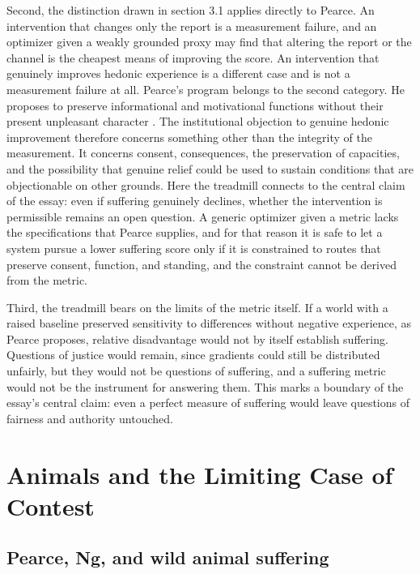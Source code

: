 \documentclass[11pt]{article}
\begin{document}
Second, the distinction drawn in section 3.1 applies directly to Pearce. An intervention that changes only the report is a measurement failure, and an optimizer given a weakly grounded proxy may find that altering the report or the channel is the cheapest means of improving the score. An intervention that genuinely improves hedonic experience is a different case and is not a measurement failure at all. Pearce's program belongs to the second category. He proposes to preserve informational and motivational functions without their present unpleasant character \citep{pearce1995}. The institutional objection to genuine hedonic improvement therefore concerns something other than the integrity of the measurement. It concerns consent, consequences, the preservation of capacities, and the possibility that genuine relief could be used to sustain conditions that are objectionable on other grounds. Here the treadmill connects to the central claim of the essay: even if suffering genuinely declines, whether the intervention is permissible remains an open question. A generic optimizer given a metric lacks the specifications that Pearce supplies, and for that reason it is safe to let a system pursue a lower suffering score only if it is constrained to routes that preserve consent, function, and standing, and the constraint cannot be derived from the metric.

Third, the treadmill bears on the limits of the metric itself. If a world with a raised baseline preserved sensitivity to differences without negative experience, as Pearce proposes, relative disadvantage would not by itself establish suffering. Questions of justice would remain, since gradients could still be distributed unfairly, but they would not be questions of suffering, and a suffering metric would not be the instrument for answering them. This marks a boundary of the essay's central claim: even a perfect measure of suffering would leave questions of fairness and authority untouched.

\section{Animals and the Limiting Case of Contest}

\subsection{Pearce, Ng, and wild animal suffering}
\end{document}
